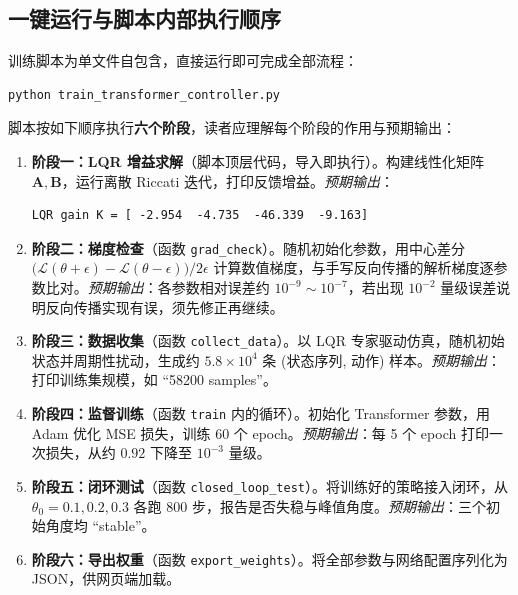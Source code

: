 \documentclass[11pt,a4paper]{article}
\begin{document}
\subsection{一键运行与脚本内部执行顺序}

训练脚本为单文件自包含，直接运行即可完成全部流程：

\begin{lstlisting}[language=bash]
python train_transformer_controller.py
\end{lstlisting}

脚本按如下顺序执行\textbf{六个阶段}，读者应理解每个阶段的作用与预期输出：

\begin{enumerate}
    \item \textbf{阶段一：LQR 增益求解}（脚本顶层代码，导入即执行）。构建线性化矩阵 $\mathbf A, \mathbf B$，运行离散 Riccati 迭代，打印反馈增益。\emph{预期输出}：
    \begin{lstlisting}
LQR gain K = [ -2.954  -4.735  -46.339  -9.163]
    \end{lstlisting}

    \item \textbf{阶段二：梯度检查}（函数 \texttt{grad\_check}）。随机初始化参数，用中心差分 $\big(\mathcal L(\theta+\epsilon)-\mathcal L(\theta-\epsilon)\big)/2\epsilon$ 计算数值梯度，与手写反向传播的解析梯度逐参数比对。\emph{预期输出}：各参数相对误差约 $10^{-9}\sim 10^{-7}$，若出现 $10^{-2}$ 量级误差说明反向传播实现有误，须先修正再继续。

    \item \textbf{阶段三：数据收集}（函数 \texttt{collect\_data}）。以 LQR 专家驱动仿真，随机初始状态并周期性扰动，生成约 $5.8\times 10^4$ 条 (状态序列, 动作) 样本。\emph{预期输出}：打印训练集规模，如 ``58200 samples''。

    \item \textbf{阶段四：监督训练}（函数 \texttt{train} 内的循环）。初始化 Transformer 参数，用 Adam 优化 MSE 损失，训练 60 个 epoch。\emph{预期输出}：每 5 个 epoch 打印一次损失，从约 $0.92$ 下降至 $10^{-3}$ 量级。

    \item \textbf{阶段五：闭环测试}（函数 \texttt{closed\_loop\_test}）。将训练好的策略接入闭环，从 $\theta_0 = 0.1, 0.2, 0.3$ 各跑 800 步，报告是否失稳与峰值角度。\emph{预期输出}：三个初始角度均 ``stable''。

    \item \textbf{阶段六：导出权重}（函数 \texttt{export\_weights}）。将全部参数与网络配置序列化为 JSON，供网页端加载。
\end{enumerate}
\end{document}
